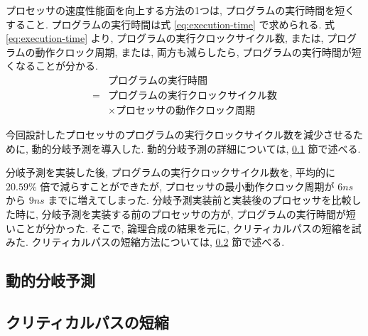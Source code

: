 \documentclass[../main.tex]{subfiles}
\begin{document}
  プロセッサの速度性能面を向上する方法の1つは, プログラムの実行時間を短くすること.
  プログラムの実行時間は式 \ref{eq:execution-time} で求められる.
  式 \ref{eq:execution-time} より, プログラムの実行クロックサイクル数, 
  または, プログラムの動作クロック周期, 
  または, 両方も減らしたら, プログラムの実行時間が短くなることが分かる.
  \begin{equation}
    \begin{aligned}
      &プログラムの実行時間 \\
      = &プログラムの実行クロックサイクル数 \\
      &\times プロセッサの動作クロック周期
      \label{eq:execution-time}
    \end{aligned}
  \end{equation}

  今回設計したプロセッサのプログラムの実行クロックサイクル数を減少させるために, 動的分岐予測を導入した.
  動的分岐予測の詳細については, \ref{subsection:jump-prediction} 節で述べる.

  分岐予測を実装した後, プログラムの実行クロックサイクル数を, 
  平均的に $20.59\%$ 倍で減らすことができたが, 
  プロセッサの最小動作クロック周期が $6ns$ から $9ns$ までに増えてしまった.
  分岐予測実装前と実装後のプロセッサを比較した時に, 
  分岐予測を実装する前のプロセッサの方が, 
  プログラムの実行時間が短いことが分かった.
  そこで, 論理合成の結果を元に, クリティカルパスの短縮を試みた.
  クリティカルパスの短縮方法については, \ref{subsection:critical-path} 節で述べる.

  \subsection{動的分岐予測} \label{subsection:jump-prediction}
  

  \subsection{クリティカルパスの短縮} \label{subsection:critical-path}
  
\end{document}
